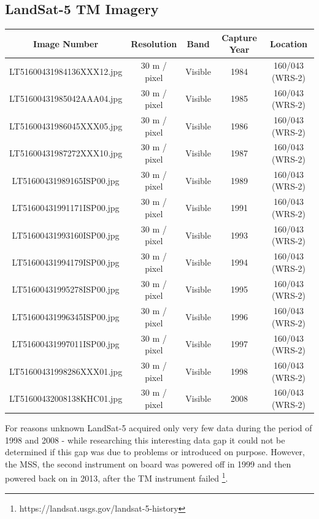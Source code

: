 \subsection{LandSat-5 TM Imagery}
\begin{table}[h!]
	\centering
	\begin{tabular}{| c | c | c | c | c |}
	\hline
	\textbf{Image Number} & \textbf{Resolution} & \textbf{Band} & \textbf{Capture Year} & \textbf{Location} \\ \hline
	LT51600431984136XXX12.jpg & 30 m / pixel& Visible & 1984 & 160/043 (WRS-2) \\ \hline 
	LT51600431985042AAA04.jpg & 30 m / pixel& Visible & 1985 & 160/043 (WRS-2) \\ \hline 
	LT51600431986045XXX05.jpg & 30 m / pixel& Visible & 1986 & 160/043 (WRS-2) \\ \hline 
	LT51600431987272XXX10.jpg & 30 m / pixel& Visible & 1987 & 160/043 (WRS-2) \\ \hline 
	LT51600431989165ISP00.jpg & 30 m / pixel& Visible & 1989 & 160/043 (WRS-2) \\ \hline 
	LT51600431991171ISP00.jpg & 30 m / pixel& Visible & 1991 & 160/043 (WRS-2) \\ \hline 
	LT51600431993160ISP00.jpg & 30 m / pixel& Visible & 1993 & 160/043 (WRS-2) \\ \hline 
	LT51600431994179ISP00.jpg & 30 m / pixel& Visible & 1994 & 160/043 (WRS-2) \\ \hline 
	LT51600431995278ISP00.jpg & 30 m / pixel& Visible & 1995 & 160/043 (WRS-2) \\ \hline 
	LT51600431996345ISP00.jpg & 30 m / pixel& Visible & 1996 & 160/043 (WRS-2) \\ \hline 
	LT51600431997011ISP00.jpg & 30 m / pixel& Visible & 1997 & 160/043 (WRS-2) \\ \hline 
	LT51600431998286XXX01.jpg & 30 m / pixel& Visible & 1998 & 160/043 (WRS-2) \\ \hline 
	LT51600432008138KHC01.jpg & 30 m / pixel& Visible & 2008 & 160/043 (WRS-2) \\ \hline 
	\end{tabular}
\end{table}

For reasons unknown LandSat-5 acquired only very few data during the period of 1998 and 2008 - while researching this interesting data gap it could not be determined if this gap was due to problems or introduced on purpose. However, the MSS, the second instrument on board was powered off in 1999 and then powered back on in 2013, after the TM instrument failed \footnote{https://landsat.usgs.gov/landsat-5-history}.

